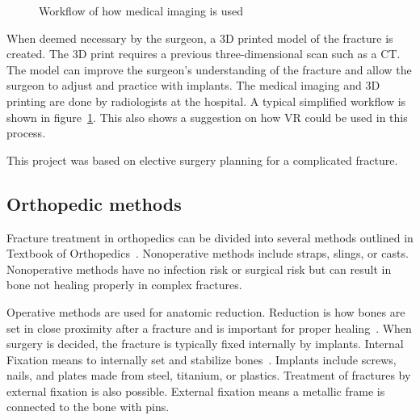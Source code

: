 \documentclass[a4paper]{report}
\begin{document}
\begin{figure}[h!]
    \centering
	\hfill
  \caption{Workflow of how medical imaging is used}
  \label{arbeidsflyt}
  \small
\end{figure}

When deemed necessary by the surgeon, a 3D printed model of the fracture is created. The 3D print requires a previous three-dimensional scan such as a CT. The model can improve the surgeon's understanding of the fracture and allow the surgeon to adjust and practice with implants. The medical imaging and 3D printing are done by radiologists at the hospital.
A typical simplified workflow is shown in figure~\ref{arbeidsflyt}. This also shows a suggestion on how VR could be used in this process.

This project was based on elective surgery planning for a complicated fracture.

\subsection{Orthopedic methods}

Fracture treatment in orthopedics can be divided into several methods outlined in Textbook of Orthopedics~\cite{ebnezar_textbook_2016}.
Nonoperative methods include straps, slings, or casts.
Nonoperative methods have no infection risk or surgical risk but can result in bone not healing properly in complex fractures.

Operative methods are used for anatomic reduction. Reduction is how bones are set in close proximity after a fracture and is important for proper healing~\cite{verywell_health_fracture_nodate}.
When surgery is decided, the fracture is typically fixed internally by implants.
Internal Fixation means to internally set and stabilize bones~\cite{ebnezar_textbook_2016}.
Implants include screws, nails, and plates made from steel, titanium, or plastics.
Treatment of fractures by external fixation is also possible. External fixation means a metallic frame is connected to the bone with pins.
\end{document}
